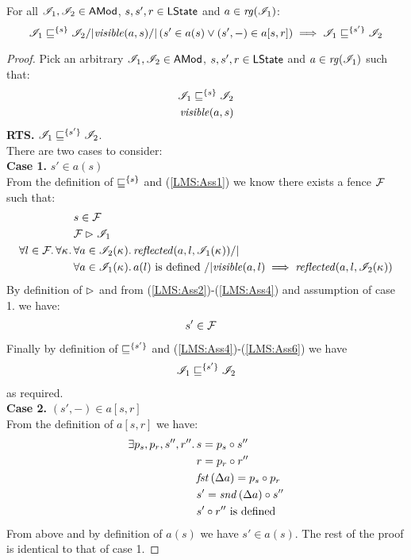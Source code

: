 \begin{lemma}\label{lem:shift-fence}
For all $\mathscr{I}_1, \mathscr{I}_2 \in \textsf{AMod}$, $s, s', r \in \textsf{LState}$ and $a \in \mathit{rg}(\mathscr{I}_1)$:
%
\[
	\mathscr{I}_1 \sqsubseteq^{\{s\}} \mathscr{I}_2 /| \mathit{visible}(a, s) /| \left(s' \in a(s) \lor (s', -) \in a[s, r] \right) \implies \mathscr{I}_1 \sqsubseteq^{\{s'\}} \mathscr{I}_2
\]
%
\begin{proof}
Pick an arbitrary $\mathscr{I}_1, \mathscr{I}_2 \in \textsf{AMod}$, $s, s', r \in \textsf{LState}$ and $a \in \mathit{rg}(\mathscr{I}_1)$ such that:
%
\begin{align}
	\mathscr{I}_1 \sqsubseteq^{\{s\}} \mathscr{I}_2 \label{LMS:Ass1}\\
	\mathit{visible}(a, s)  \label{LMS:Ass2}
\end{align}
\textbf{RTS. } $\mathscr{I}_1 \sqsubseteq^{\{s'\}} \mathscr{I}_2$.\\
There are two cases to consider:\\
\textbf{Case 1. }$s' \in a(s)$\\
From the definition of $\sqsubseteq^{\{s\}}$ and (\ref{LMS:Ass1}) we know there exists a fence $\mathcal{F}_{}$ such that:
%
\begin{align}
	& s \in \fence{} \label{LMS:Ass3}\\
	& \fence{} \fences \lmod_1 \label{LMS:Ass4}\\
	\for{l \in \fence{}} \for{\ca{}}& \for{a \in \lmod_2(\ca{})} \m{reflected}(a, l, \lmod_1(\ca{})) /| \null \nonumber\\
	& \for{a \in \lmod_1(\ca{})} a(l) \text{ is defined } /| \m{visible}(a, l) \implies \m{reflected}(a, l, \lmod_2(\ca{})) \label{LMS:Ass5}
\end{align}
By definition of $\mathrel{\rhd}$ and from (\ref{LMS:Ass2})-(\ref{LMS:Ass4}) and assumption of case 1. we have: 
%
\begin{align}
	& s' \in \mathcal{F}_{} \label{LMS:Ass6}
\end{align}
%
Finally by definition of $\sqsubseteq^{\{s'\}}$ and (\ref{LMS:Ass4})-(\ref{LMS:Ass6}) we have
%
\begin{align*}
	\mathscr{I}_1 \sqsubseteq^{\{s'\}} \mathscr{I}_2
\end{align*}
%
as required.\\

\noindent\textbf{Case 2. }$(s', -) \in a[s, r]$\\
From the definition of $a[s, r]$ we have:
\begin{align*}
	\exists p_s, p_r, s'', r''.\, & s = p_s \circ s''\\
	& r = p_r \circ r'' \\
	& \mathit{fst}\left(\Delta {a}\right) = p_s \circ p_r \\
	& s' = \mathit{snd}\left(\Delta {a}\right) \circ s'' \\
	& s' \circ r'' \text{ is defined}
\end{align*}
%
From above and by definition of $a(s)$ we have $s' \in a(s)$. The rest of the proof is identical to that of case 1.
\end{proof}
\end{lemma}
